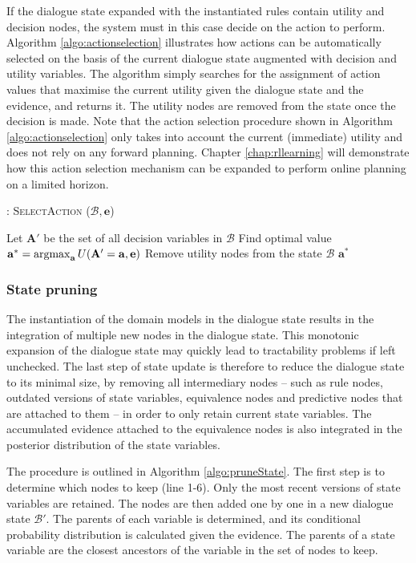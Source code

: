 If the dialogue state expanded with the instantiated rules contain utility and decision nodes, the system must in this case decide on the action to perform.  Algorithm \ref{algo:actionselection} illustrates how actions can be automatically selected on the basis of the current dialogue state augmented with decision and utility variables. The algorithm simply searches for the assignment of action values that maximise the current utility given the dialogue state and the evidence, and returns it. The utility nodes are removed from the state once the decision is made. Note that the action selection procedure shown in Algorithm \ref{algo:actionselection} only takes into account the current (immediate) utility and does not rely on any forward planning.  Chapter \ref{chap:rllearning} will demonstrate how this action selection mechanism can be expanded to perform online planning on a limited horizon. 

\begin{algorithm}[h]
\caption{: \textsc{SelectAction} ($\mathcal{B}, \mathbf{e}$)}
\begin{algorithmic}[1] \vspace{1mm}
\STATE Let $\mathbf{A}'$ be the set of all decision variables in $\mathcal{B}$
\STATE Find optimal value $\mathbf{a}^* = \argmax_{\mathbf{a}} U(\mathbf{A}' = \mathbf{a}, \mathbf{e})$
\STATE Remove utility nodes from the state $\mathcal{B}$
\RETURN $\mathbf{a}^*$
\end{algorithmic}
\label{algo:actionselection}
\end{algorithm}


\subsubsection*{State pruning}

The instantiation of the domain models in the dialogue state results in the integration of multiple new nodes in the dialogue state. This monotonic expansion of the dialogue state may quickly lead to tractability problems if left unchecked.  The last step of state update is therefore to reduce the dialogue state to its minimal size, by removing all intermediary nodes -- such as rule nodes, outdated versions of state variables, equivalence nodes and predictive nodes that are attached to them -- in order to only retain current state variables. The accumulated evidence attached to the equivalence nodes is also integrated in the posterior distribution of the state variables.

The procedure is outlined in Algorithm \ref{algo:pruneState}. The first step is to determine which nodes to keep (line 1-6).  Only the most recent versions of state variables are retained. 
The nodes are then added one by one in a new dialogue state $\mathcal{B}'$.  The parents of each variable is determined, and its conditional probability distribution is calculated given the evidence.  The parents of a state variable are the closest ancestors of the variable in the set of nodes to keep. 


